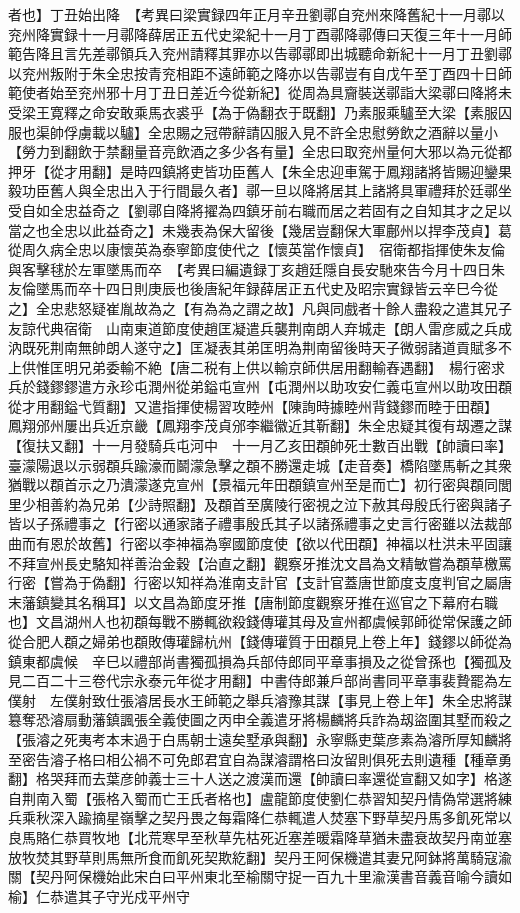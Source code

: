 者也】丁丑始出降　【考異曰梁實録四年正月辛丑劉鄩自兖州來降舊紀十一月鄩以兖州降實録十一月鄩降薛居正五代史梁紀十一月丁酉鄩降鄩傳曰天復三年十一月師範告降且言先差鄩領兵入兖州請釋其罪亦以告鄩鄩即出城聽命新紀十一月丁丑劉鄩以兖州叛附于朱全忠按青兖相距不遠師範之降亦以告鄩豈有自戊午至丁酉四十日師範使者始至兖州邪十月丁丑日差近今從新紀】從周為具齎裝送鄩詣大梁鄩曰降將未受梁王寛釋之命安敢乘馬衣裘乎【為于偽翻衣于既翻】乃素服乘驢至大梁【素服囚服也渠帥俘虜載以驢】全忠賜之冠帶辭請囚服入見不許全忠慰勞飲之酒辭以量小【勞力到翻飲于禁翻量音亮飲酒之多少各有量】全忠曰取兖州量何大邪以為元從都押牙【從才用翻】是時四鎮將吏皆功臣舊人【朱全忠迎車駕于鳳翔諸將皆賜迎鑾果毅功臣舊人與全忠出入于行間最久者】鄩一旦以降將居其上諸將具軍禮拜於廷鄩坐受自如全忠益奇之【劉鄩自降將擢為四鎮牙前右職而居之若固有之自知其才之足以當之也全忠以此益奇之】未幾表為保大留後【幾居豈翻保大軍鄜州以捍李茂貞】葛從周久病全忠以康懷英為泰寧節度使代之【懷英當作懷貞】　宿衛都指揮使朱友倫與客擊毬於左軍墜馬而卒　【考異曰編遺録丁亥趙廷隱自長安馳來告今月十四日朱友倫墜馬而卒十四日則庚辰也後唐紀年録薛居正五代史及昭宗實録皆云辛巳今從之】全忠悲怒疑崔胤故為之【有為為之謂之故】凡與同戲者十餘人盡殺之遣其兄子友諒代典宿衛　山南東道節度使趙匡凝遣兵襲荆南朗人弃城走【朗人雷彦威之兵成汭既死荆南無帥朗人遂守之】匡凝表其弟匡明為荆南留後時天子微弱諸道貢賦多不上供惟匡明兄弟委輸不絶【唐二税有上供以輸京師供居用翻輸舂遇翻】　楊行密求兵於錢鏐鏐遣方永珍屯潤州從弟鎰屯宣州【屯潤州以助攻安仁義屯宣州以助攻田頵從才用翻鎰弋質翻】又遣指揮使楊習攻睦州【陳詢時據睦州背錢鏐而睦于田頵】　鳳翔邠州屢出兵近京畿【鳳翔李茂貞邠李繼徽近其靳翻】朱全忠疑其復有刼遷之謀【復扶又翻】十一月發騎兵屯河中　十一月乙亥田頵帥死士數百出戰【帥讀曰率】臺濛陽退以示弱頵兵踰濠而鬬濛急擊之頵不勝還走城【走音奏】橋陷墜馬斬之其衆猶戰以頵首示之乃潰濛遂克宣州【景福元年田頵鎮宣州至是而亡】初行密與頵同閭里少相善約為兄弟【少詩照翻】及頵首至廣陵行密視之泣下赦其母殷氏行密與諸子皆以子孫禮事之【行密以通家諸子禮事殷氏其子以諸孫禮事之史言行密雖以法裁部曲而有恩於故舊】行密以李神福為寧國節度使【欲以代田頵】神福以杜洪未平固讓不拜宣州長史駱知祥善治金穀【治直之翻】觀察牙推沈文昌為文精敏嘗為頵草檄罵行密【嘗為于偽翻】行密以知祥為淮南支計官【支計官蓋唐世節度支度判官之屬唐末藩鎮變其名稱耳】以文昌為節度牙推【唐制節度觀察牙推在巡官之下幕府右職也】文昌湖州人也初頵每戰不勝輒欲殺錢傳瓘其母及宣州都虞候郭師從常保護之師從合肥人頵之婦弟也頵敗傳瓘歸杭州【錢傳瓘質于田頵見上卷上年】錢鏐以師從為鎮東都虞候　辛巳以禮部尚書獨孤損為兵部侍郎同平章事損及之從曾孫也【獨孤及見二百二十三卷代宗永泰元年從才用翻】中書侍郎兼戶部尚書同平章事裴贄罷為左僕射　左僕射致仕張濬居長水王師範之舉兵濬豫其謀【事見上卷上年】朱全忠將謀簒奪恐濬扇動藩鎮諷張全義使圖之丙申全義遣牙將楊麟將兵詐為刼盜圍其墅而殺之【張濬之死夷考本末過于白馬朝士遠矣墅承與翻】永寧縣吏葉彦素為濬所厚知麟將至密告濬子格曰相公禍不可免郎君宜自為謀濬謂格曰汝留則俱死去則遺種【種章勇翻】格哭拜而去葉彦帥義士三十人送之渡漢而還【帥讀曰率還從宣翻又如字】格遂自荆南入蜀【張格入蜀而亡王氏者格也】盧龍節度使劉仁恭習知契丹情偽常選將練兵乘秋深入踰摘星嶺擊之契丹畏之每霜降仁恭輒遣人焚塞下野草契丹馬多飢死常以良馬賂仁恭買牧地【北荒寒早至秋草先枯死近塞差暖霜降草猶未盡衰故契丹南並塞放牧焚其野草則馬無所食而飢死契欺紇翻】契丹王阿保機遣其妻兄阿鉢將萬騎寇渝關【契丹阿保機始此宋白曰平州東北至榆關守捉一百九十里渝漢書音義音喻今讀如榆】仁恭遣其子守光戍平州守